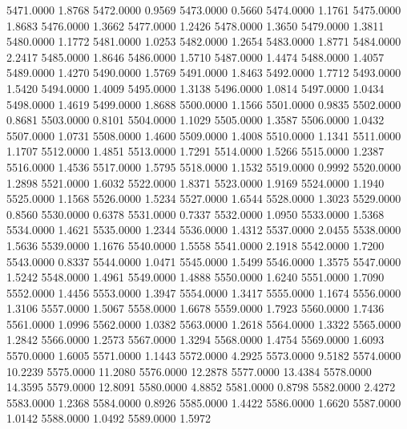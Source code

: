5471.0000      1.8768
5472.0000      0.9569
5473.0000      0.5660
5474.0000      1.1761
5475.0000      1.8683
5476.0000      1.3662
5477.0000      1.2426
5478.0000      1.3650
5479.0000      1.3811
5480.0000      1.1772
5481.0000      1.0253
5482.0000      1.2654
5483.0000      1.8771
5484.0000      2.2417
5485.0000      1.8646
5486.0000      1.5710
5487.0000      1.4474
5488.0000      1.4057
5489.0000      1.4270
5490.0000      1.5769
5491.0000      1.8463
5492.0000      1.7712
5493.0000      1.5420
5494.0000      1.4009
5495.0000      1.3138
5496.0000      1.0814
5497.0000      1.0434
5498.0000      1.4619
5499.0000      1.8688
5500.0000      1.1566
5501.0000      0.9835
5502.0000      0.8681
5503.0000      0.8101
5504.0000      1.1029
5505.0000      1.3587
5506.0000      1.0432
5507.0000      1.0731
5508.0000      1.4600
5509.0000      1.4008
5510.0000      1.1341
5511.0000      1.1707
5512.0000      1.4851
5513.0000      1.7291
5514.0000      1.5266
5515.0000      1.2387
5516.0000      1.4536
5517.0000      1.5795
5518.0000      1.1532
5519.0000      0.9992
5520.0000      1.2898
5521.0000      1.6032
5522.0000      1.8371
5523.0000      1.9169
5524.0000      1.1940
5525.0000      1.1568
5526.0000      1.5234
5527.0000      1.6544
5528.0000      1.3023
5529.0000      0.8560
5530.0000      0.6378
5531.0000      0.7337
5532.0000      1.0950
5533.0000      1.5368
5534.0000      1.4621
5535.0000      1.2344
5536.0000      1.4312
5537.0000      2.0455
5538.0000      1.5636
5539.0000      1.1676
5540.0000      1.5558
5541.0000      2.1918
5542.0000      1.7200
5543.0000      0.8337
5544.0000      1.0471
5545.0000      1.5499
5546.0000      1.3575
5547.0000      1.5242
5548.0000      1.4961
5549.0000      1.4888
5550.0000      1.6240
5551.0000      1.7090
5552.0000      1.4456
5553.0000      1.3947
5554.0000      1.3417
5555.0000      1.1674
5556.0000      1.3106
5557.0000      1.5067
5558.0000      1.6678
5559.0000      1.7923
5560.0000      1.7436
5561.0000      1.0996
5562.0000      1.0382
5563.0000      1.2618
5564.0000      1.3322
5565.0000      1.2842
5566.0000      1.2573
5567.0000      1.3294
5568.0000      1.4754
5569.0000      1.6093
5570.0000      1.6005
5571.0000      1.1443
5572.0000      4.2925
5573.0000      9.5182
5574.0000     10.2239
5575.0000     11.2080
5576.0000     12.2878
5577.0000     13.4384
5578.0000     14.3595
5579.0000     12.8091
5580.0000      4.8852
5581.0000      0.8798
5582.0000      2.4272
5583.0000      1.2368
5584.0000      0.8926
5585.0000      1.4422
5586.0000      1.6620
5587.0000      1.0142
5588.0000      1.0492
5589.0000      1.5972

